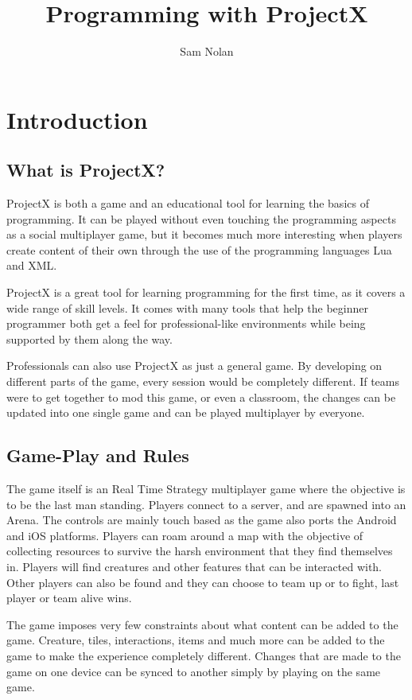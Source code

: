 \documentclass{book}
\author{Sam Nolan}
\title{Programming with ProjectX}
\begin{document}
	\maketitle
	\tableofcontents
	\chapter{Introduction}
	\section{What is ProjectX?}
	ProjectX is both a game and an educational tool for learning the basics of programming. It can be played without even touching the programming aspects as a social multiplayer game, but it becomes much more interesting when players create content of their own through the use of the programming languages Lua and XML.
	
	ProjectX is a great tool for learning programming for the first time, as it covers a wide range of skill levels. It comes with many tools that help the beginner programmer both get a feel for professional-like environments while being supported by them along the way.
	
	Professionals can also use ProjectX as just a general game. By developing on different parts of the game, every session would be completely different. If teams were to get together to mod this game, or even a classroom, the changes can be updated into one single game and can be played multiplayer by everyone. 
	
	\section{Game-Play and Rules}
	The game itself is an Real Time Strategy multiplayer game where the objective is to be the last man standing. Players connect to a server, and are spawned into an Arena. The controls are mainly touch based as the game also ports the Android and iOS platforms. Players can roam around a map with the objective of collecting resources to survive the harsh environment that they find themselves in. Players will find creatures and other features that can be interacted with. Other players can also be found and they can choose to team up or to fight, last player or team alive wins.
	
	The game imposes very few constraints about what content can be added to the game. Creature, tiles, interactions, items and much more can be added to the game to make the experience completely different. Changes that are made to the game on one device can be synced to another simply by playing on the same game.
	
\end{document}
